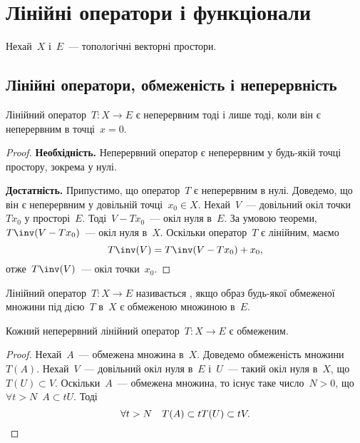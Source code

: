 \chapter{Лінійні оператори і функціонали}

Нехай~$X$ і~$E$~--- топологічні векторні простори.

\section{Лінійні оператори, обмеженість і неперервність}

\begin{theorem}
    \label{th:linear-continuous-functional-is-continuous-at-zero}
    Лінійний оператор~$T: X \to E$ є неперервним тоді і лише тоді, коли він є неперервним в точці~$x = 0$.
\end{theorem}

\begin{proof}
    \textbf{Необхідність.} Неперервний оператор є неперервним у будь-якій точці простору, зокрема у нулі.

    \textbf{Достатність.} Припустимо, що оператор~$T$ є неперервним в нулі. Доведемо, що він є неперервним у довільній точці~$x_0 \in X$. Нехай~$V$~--- довільний окіл точки~$T x_0$ у просторі~$E$. Тоді~$V - T x_0$~--- окіл нуля в~$E$. За умовою теореми, $T\inv(V - T x_0)$~--- окіл нуля в~$X$. Оскільки оператор~$T$ є лінійним, маємо
    \begin{equation*}
        T\inv(V) = T\inv(V - T x_0) + x_0,
    \end{equation*}
    отже~$T\inv(V)$~--- окіл точки~$x_0$.
\end{proof}

\begin{definition}
    Лінійний оператор~$T: X \to E$ називається , якщо образ будь-якої обмеженої множини під дією~$T$ в~$X$ є обмеженою множиною в~$E$.
\end{definition}

\begin{theorem}
    \label{th:linear-continuous-functional-is-bounded}
    Кожний неперервний лінійний оператор~$T: X \to E$ є обмеженим.
\end{theorem}

\begin{proof}
    Нехай~$A$~--- обмежена множина в~$X$. Доведемо обмеженість множини~$T(A)$. Нехай~$V$~--- довільний окіл нуля в~$E$ і~$U$~--- такий окіл нуля в~$X$, що~$T(U) \subset V$. Оскільки~$A$~--- обмежена множина, то існує таке число~$N > 0$, що~$\forall t > N$~$A \subset t U$. Тоді
    \begin{equation*}
        \forall t > N \quad T(A) \subset t T(U) \subset t V. \qedhere
    \end{equation*}
\end{proof}

